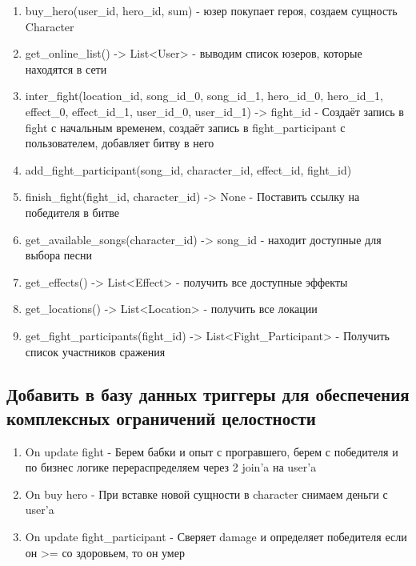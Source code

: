 \begin{enumerate}
    \item buy\_hero(user\_id, hero\_id, sum) 
    - юзер покупает героя, создаем сущность Character

    \item get\_online\_list() -> List<User>
    - выводим список юзеров, которые находятся в сети

    \item inter\_fight(location\_id, song\_id\_0, song\_id\_1, hero\_id\_0, hero\_id\_1, effect\_0, effect\_id\_1, user\_id\_0, user\_id\_1) -> fight\_id
    - Создаёт запись в fight с начальным временем, создаёт запись в fight\_participant с пользователем, добавляет битву в него 

    \item add\_fight\_participant(song\_id, character\_id, effect\_id, fight\_id)

    \item finish\_fight(fight\_id, character\_id) -> None
    - Поставить ссылку на победителя в битве

    \item get\_available\_songs(character\_id) -> song\_id
    - находит доступные для выбора песни
    
    \item get\_effects() -> List<Effect>
    - получить все доступные эффекты 
    
    \item get\_locations() -> List<Location>
    - получить все локации

    \item get\_fight\_participants(fight\_id) -> List<Fight\_Participant>
    - Получить список участников сражения

    \end{enumerate}

\subsection*{Добавить в базу данных триггеры для обеспечения комплексных ограничений
целостности}

\begin{enumerate}
    \item On update fight 
    - Берем бабки и опыт с програвшего, берем с победителя и по бизнес логике перераспределяем через 2 join'a на user'a

    \item On buy hero
    - При вставке новой сущности в character снимаем деньги с user'a

    \item On update fight\_participant
    - Сверяет damage и определяет победителя если он >= со здоровьем, то он умер

    
\end{enumerate}